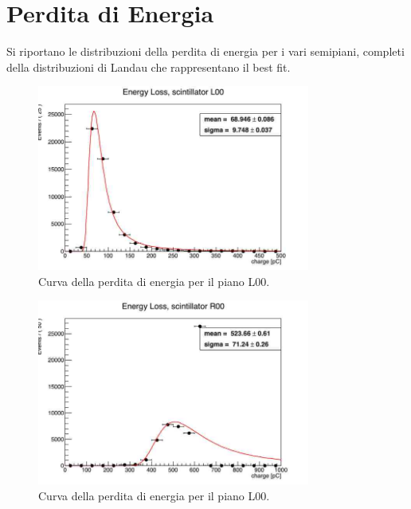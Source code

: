 
\chapter{Perdita di Energia}             %
Si riportano le distribuzioni della perdita di energia per i vari semipiani, completi della distribuzioni di Landau che rappresentano il best fit.

\begin{figure}[H]
  \centering
  \includegraphics[width=0.8\textwidth]{plots/energy_L00.jpg}
  \caption{Curva della perdita di energia per il piano L00.}
  \label{fig:l00}
\end{figure}

\begin{figure}[H]
  \centering
  \includegraphics[width=0.8\textwidth]{plots/energy_R00.jpg}
  \caption{Curva della perdita di energia per il piano L00.}
  \label{fig:r00}
\end{figure}

